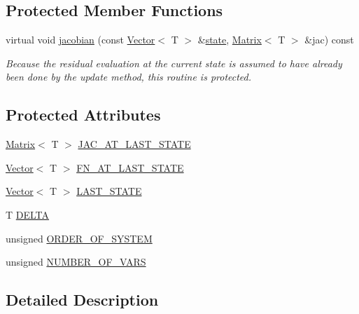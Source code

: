 \subsection*{Protected Member Functions}
\begin{DoxyCompactItemize}
\item 
virtual void \hyperlink{classLuna_1_1Residual_acfcbc7bc2731b0c432de7f98b9b7cca5}{jacobian} (const \hyperlink{classLuna_1_1Vector}{Vector}$<$ T $>$ \&\hyperlink{classLuna_1_1Residual_a41d9f863aa529f16c5d78fb19b4906bd}{state}, \hyperlink{classLuna_1_1Matrix}{Matrix}$<$ T $>$ \&jac) const
\begin{DoxyCompactList}\small\item\em Because the residual evaluation at the current state is assumed to have already been done by the \textquotesingle{}update\textquotesingle{} method, this routine is protected. \end{DoxyCompactList}\end{DoxyCompactItemize}
\subsection*{Protected Attributes}
\begin{DoxyCompactItemize}
\item 
\hyperlink{classLuna_1_1Matrix}{Matrix}$<$ T $>$ \hyperlink{classLuna_1_1Residual_ac76c460240288f84309b587c785df06a}{J\+A\+C\+\_\+\+A\+T\+\_\+\+L\+A\+S\+T\+\_\+\+S\+T\+A\+TE}
\item 
\hyperlink{classLuna_1_1Vector}{Vector}$<$ T $>$ \hyperlink{classLuna_1_1Residual_ac7b086911239d3f42ceec4a826e83543}{F\+N\+\_\+\+A\+T\+\_\+\+L\+A\+S\+T\+\_\+\+S\+T\+A\+TE}
\item 
\hyperlink{classLuna_1_1Vector}{Vector}$<$ T $>$ \hyperlink{classLuna_1_1Residual_abcfc99f00aa4cf3616b32dfd5315dece}{L\+A\+S\+T\+\_\+\+S\+T\+A\+TE}
\item 
T \hyperlink{classLuna_1_1Residual_a1bf38ddfa149797de560dcb11c975fef}{D\+E\+L\+TA}
\item 
unsigned \hyperlink{classLuna_1_1Residual_a7facf1267eb277d84aeea8beba2cb200}{O\+R\+D\+E\+R\+\_\+\+O\+F\+\_\+\+S\+Y\+S\+T\+EM}
\item 
unsigned \hyperlink{classLuna_1_1Residual_a8e7a52a94a49d900ba2784e621a35668}{N\+U\+M\+B\+E\+R\+\_\+\+O\+F\+\_\+\+V\+A\+RS}
\end{DoxyCompactItemize}


\subsection{Detailed Description}
